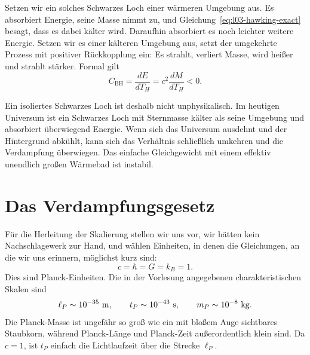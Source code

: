 Setzen wir ein solches Schwarzes Loch einer wärmeren Umgebung aus. Es absorbiert Energie, seine Masse nimmt zu, und Gleichung~\eqref{eq:l03-hawking-exact} besagt, dass es dabei kälter wird. Daraufhin absorbiert es noch leichter weitere Energie. Setzen wir es einer kälteren Umgebung aus, setzt der umgekehrte Prozess mit positiver Rückkopplung ein: Es strahlt, verliert Masse, wird heißer und strahlt stärker. Formal gilt
\begin{equation}
C_{\mathrm{BH}}
=\frac{dE}{dT_H}
=c^2\frac{dM}{dT_H}
<0.
\end{equation}

\begin{classroomqa}
\end{classroomqa}

Ein isoliertes Schwarzes Loch ist deshalb nicht unphysikalisch. Im heutigen Universum ist ein Schwarzes Loch mit Sternmasse kälter als seine Umgebung und absorbiert überwiegend Energie. Wenn sich das Universum ausdehnt und der Hintergrund abkühlt, kann sich das Verhältnis schließlich umkehren und die Verdampfung überwiegen. Das einfache Gleichgewicht mit einem effektiv unendlich großen Wärmebad ist instabil.

\section{Das Verdampfungsgesetz}

Für die Herleitung der Skalierung stellen wir uns vor, wir hätten kein Nachschlagewerk zur Hand, und wählen Einheiten, in denen die Gleichungen, an die wir uns erinnern, möglichst kurz sind:
\begin{equation}
c=\hbar=G=k_B=1.
\end{equation}
Dies sind Planck-Einheiten. Die in der Vorlesung angegebenen charakteristischen Skalen sind
\begin{equation}
\ell_P\sim10^{-35}\ {\rm m},
\qquad
t_P\sim10^{-43}\ {\rm s},
\qquad
m_P\sim10^{-8}\ {\rm kg}.
\end{equation}
Die Planck-Masse ist ungefähr so groß wie ein mit bloßem Auge sichtbares Staubkorn, während Planck-Länge und Planck-Zeit außerordentlich klein sind. Da \(c=1\), ist \(t_P\) einfach die Lichtlaufzeit über die Strecke \(\ell_P\).

